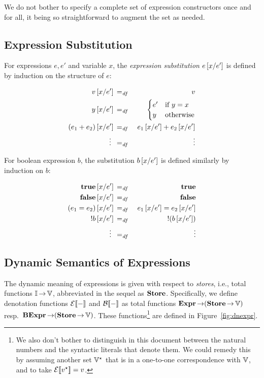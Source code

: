 \documentclass[11pt]{report}
\begin{document}
We do not bother to specify a complete set of expression constructors once and for all, it being so straightforward to augment the set as needed.


\subsection{Expression Substitution} %
\label{sub:expression_substitution}

For expressions $e,e'$ and variable $x$, the \emph{expression
substitution} $e\left[x / e'\right]$ is defined by induction on the structure of $e$:

\begin{eqnarray*}
	v\left[x / e'\right] &\operatorname{\;=_{\mathit{df}}\;}& v\\
	y\left[x / e'\right] &\operatorname{\;=_{\mathit{df}}\;}& \begin{cases} e' & \text{if $y = x$} \\ 
	y & \text{otherwise}\end{cases} \\
	(e_1 + e_2)\left[x / e'\right] &\operatorname{\;=_{\mathit{df}}\;}& e_1\left[x / e'\right] + e_2\left[x / e'\right] \\
	\vdots~ &\operatorname{\;=_{\mathit{df}}\;}& ~\vdots
\end{eqnarray*}

For boolean expression $b$, the substitution $b\left[x / e'\right]$ is
defined similarly by induction on $b$:

\begin{eqnarray*}
	\mathbf{true} \left[x / e'\right] &\operatorname{\;=_{\mathit{df}}\;}& \mathbf{true} \\
	\mathbf{false} \left[x / e'\right] &\operatorname{\;=_{\mathit{df}}\;}& \mathbf{false} \\
	(e_1 = e_2)\left[x / e'\right] &\operatorname{\;=_{\mathit{df}}\;}& e_1\left[x / e'\right] = e_2\left[x / e'\right]\\
	!b\left[x / e'\right] &\operatorname{\;=_{\mathit{df}}\;}& !(b\left[x / e'\right]) \\
	\vdots~ &\operatorname{\;=_{\mathit{df}}\;}& ~\vdots
\end{eqnarray*}




\subsection{Dynamic Semantics of Expressions} %
\label{sub:dynamic_semantics_of_expressions}

The dynamic meaning of expressions is given with respect to \emph{stores}, i.e., total functions $\mathbb{I} \operatorname{\rightarrow} \mathbb{V}$, abbreviated in the sequel as $\mathbf{Store}$. Specifically, we define denotation functions $\mathcal{E}[\![-]\!]$ and $\mathcal{B}[\![-]\!]$ as total functions $\mathbf{Expr} \operatorname{\rightarrow} (\mathbf{Store} \operatorname{\rightarrow} \mathbb{V})$ resp.~$\mathbf{BExpr} \operatorname{\rightarrow} (\mathbf{Store} \operatorname{\rightarrow} \mathbb{V})$. These functions\footnote{We also don't bother to distinguish in this document between the natural numbers and the syntactic literals that denote them. We could remedy this by assuming another set $\mathbb{V}^\star$ that is in a one-to-one correspondence with $\mathbb{V}$, and to take $\mathcal{E}[\![v^\star]\!] = v$.} are defined in Figure~\ref{fig:dnexpr}. 
\end{document}
